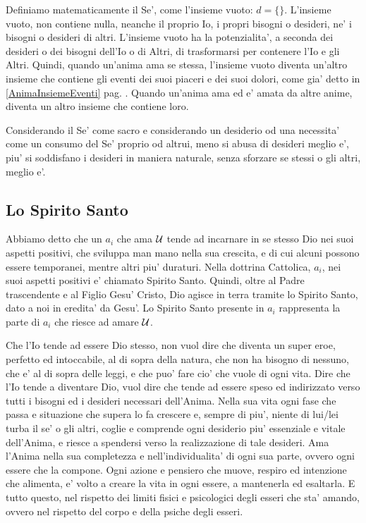 Definiamo matematicamente il Se', come l'insieme vuoto: $d=\{\}$. L'insieme vuoto, non contiene nulla, neanche il proprio Io, i propri bisogni o desideri, ne' i bisogni o desideri di altri. L'insieme vuoto ha la potenzialita', a seconda dei desideri o dei bisogni dell'Io o di Altri, di trasformarsi per contenere l'Io e gli Altri. Quindi, quando un'anima ama se stessa, l'insieme vuoto diventa un'altro insieme che contiene gli eventi dei suoi piaceri e dei suoi dolori, come gia' detto in \ref{AnimaInsiemeEventi} pag. \pageref{AnimaInsiemeEventi}. Quando un'anima ama ed e' amata da altre anime, diventa un altro insieme che contiene loro.

Considerando il Se' come sacro e considerando un desiderio od una necessita' come un consumo del Se' proprio od altrui, meno si abusa di desideri meglio e', piu' si soddisfano i desideri in maniera naturale, senza sforzare se stessi o gli altri, meglio e'.


\subsection{Lo Spirito Santo}
\label{definizioneAnimo}

Abbiamo detto che un $a_i$ che ama $\mathcal{U}$ tende ad incarnare in se stesso Dio nei suoi aspetti positivi, che sviluppa man mano nella sua crescita, e di cui alcuni possono essere temporanei, mentre altri piu' duraturi. Nella dottrina Cattolica, $a_i$, nei suoi aspetti positivi e' chiamato Spirito Santo. Quindi, oltre al Padre trascendente e al Figlio Gesu' Cristo, Dio agisce in terra tramite lo Spirito Santo, dato a noi in eredita' da Gesu'. Lo Spirito Santo presente in $a_i$ rappresenta la parte di $a_i$ che riesce ad amare $\mathcal{U}$.

Che l'Io tende ad essere Dio stesso, non vuol dire che diventa un super eroe, perfetto ed intoccabile, al di sopra della natura, che non ha bisogno di nessuno, che e' al di sopra delle leggi, e che puo' fare cio' che vuole di ogni vita. 
Dire che l'Io tende a diventare Dio, vuol dire che tende ad essere speso ed indirizzato verso tutti i bisogni ed i desideri necessari dell'Anima. Nella sua vita ogni fase che passa e situazione che supera lo fa crescere e, sempre di piu', niente di lui/lei turba il se' o gli altri, coglie e comprende ogni desiderio piu' essenziale e vitale dell'Anima, e riesce a spendersi verso la realizzazione di tale desideri. Ama l'Anima nella sua completezza e nell'individualita' di ogni sua parte, ovvero ogni essere che la compone. Ogni azione e pensiero che muove, respiro ed intenzione che alimenta, e' volto a creare la vita in ogni essere, a mantenerla ed esaltarla. E tutto questo, nel rispetto dei limiti fisici e psicologici degli esseri che sta' amando, ovvero nel rispetto del corpo e della psiche degli esseri.

